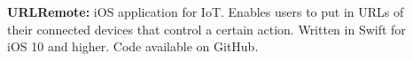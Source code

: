 
\begin{description}
    \item[]{\bf URLRemote:}
    { \footnotesize iOS application for IoT. Enables users to put in URLs of their connected devices that control a certain action. Written in Swift for iOS 10 and higher. Code available on GitHub.}
\end{description}